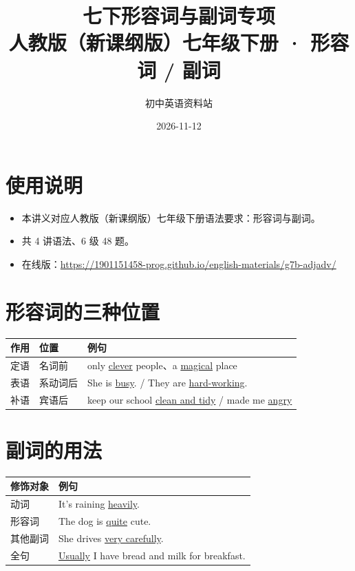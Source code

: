\documentclass[11pt,a4paper]{ctexart}
\title{\textbf{七下形容词与副词专项}\\[4pt]
\large 人教版（新课纲版）七年级下册 · 形容词 / 副词}
\author{初中英语资料站}
\date{2026-11-12}
\begin{document}
\maketitle

\section*{使用说明}
\begin{itemize}[leftmargin=1.4em]
\item 本讲义对应人教版（新课纲版）七年级下册语法要求：形容词与副词。
\item 共 4 讲语法、6 级 48 题。
\item 在线版：\url{https://1901151458-prog.github.io/english-materials/g7b-adjadv/}
\end{itemize}

\section{形容词的三种位置}
\begin{center}
\begin{tabular}{p{2.6cm}p{3.4cm}p{7.0cm}}
\hline
\textbf{作用} & \textbf{位置} & \textbf{例句}\\
\hline
定语 & 名词前 & only \underline{clever} people、a \underline{magical} place\\
表语 & 系动词后 & She is \underline{busy}. / They are \underline{hard-working}.\\
补语 & 宾语后 & keep our school \underline{clean and tidy} / made me \underline{angry}\\
\hline
\end{tabular}
\end{center}

\section{副词的用法}
\begin{center}
\begin{tabular}{p{3.4cm}p{9.0cm}}
\hline
\textbf{修饰对象} & \textbf{例句}\\
\hline
动词 & It's raining \underline{heavily}.\\
形容词 & The dog is \underline{quite} cute.\\
其他副词 & She drives \underline{very carefully}.\\
全句 & \underline{Usually} I have bread and milk for breakfast.\\
\hline
\end{tabular}
\end{center}
\end{document}
